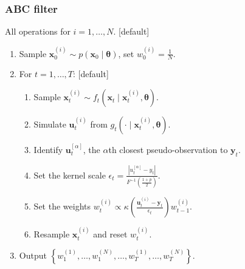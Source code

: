 \documentclass{beamer}
\newcommand{\bx}{\bm{x}}
\newcommand{\by}{\bm{y}}
\newcommand{\bu}{\bm{u}}
\newcommand{\btheta}{\bm{\theta}}
\newcommand{\trans}{f}
\newcommand{\obs}{g}
\newcommand{\sprior}{p}
\begin{document}
    \begin{frame}[noframenumbering]
    \frametitle{ABC filter}
    All operations for $i = 1, \ldots, N$.
    [default]
    \begin{enumerate}
        \item Sample $\bx_0^{(i)} \sim \sprior(\bx_0 \mid \btheta)$, set $w_0^{(i)} = \frac{1}{N}$.
        \item For $t = 1, \ldots, T$:
        [default]
        \begin{enumerate}
            \item Sample $\bx_t^{(i)} \sim \trans_t(\bx_t \mid \bx_t^{(i)}, \btheta)$.
            \item Simulate $\bu_t^{(i)}$ from $\obs_t(\cdot \mid \bx_t^{(i)}, \btheta)$.
            \item Identify $\bu_t^{[\alpha]}$, the $\alpha$th closest pseudo-observation to $\by_t$.
            \item Set the kernel scale $\epsilon_t = \frac{\left| u_t^{[\alpha]} - y_t \right|}{F^{-1}(\frac{1+p}{2})}$.
            \item Set the weights $w_t^{(i)} \propto \kappa(\frac{\bu_t^{(i)} - \by_t}{\epsilon_t}) w_{t-1}^{(i)}.$
            \item Resample $\bx_t^{(i)}$ and reset $w_t^{(i)}$.
        \end{enumerate}
        \item Output $\left\{w_1^{(1)}, \ldots, w_1^{(N)}, \ldots, w_T^{(1)}, \ldots, w_T^{(N)}\right\}$.
    \end{enumerate}
    \end{frame}
\end{document}
